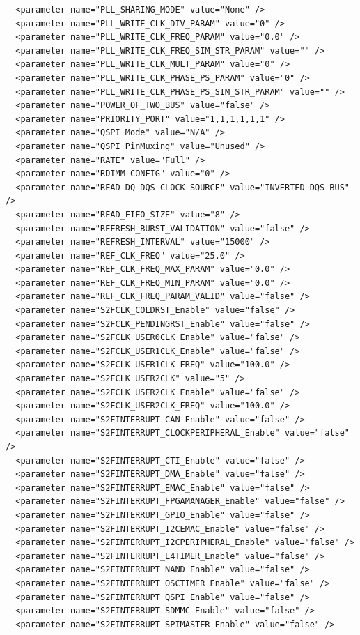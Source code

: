 \documentclass[conference]{IEEEtran}
\begin{document}
\begin{lstlisting}
  <parameter name="PLL_SHARING_MODE" value="None" />
  <parameter name="PLL_WRITE_CLK_DIV_PARAM" value="0" />
  <parameter name="PLL_WRITE_CLK_FREQ_PARAM" value="0.0" />
  <parameter name="PLL_WRITE_CLK_FREQ_SIM_STR_PARAM" value="" />
  <parameter name="PLL_WRITE_CLK_MULT_PARAM" value="0" />
  <parameter name="PLL_WRITE_CLK_PHASE_PS_PARAM" value="0" />
  <parameter name="PLL_WRITE_CLK_PHASE_PS_SIM_STR_PARAM" value="" />
  <parameter name="POWER_OF_TWO_BUS" value="false" />
  <parameter name="PRIORITY_PORT" value="1,1,1,1,1,1" />
  <parameter name="QSPI_Mode" value="N/A" />
  <parameter name="QSPI_PinMuxing" value="Unused" />
  <parameter name="RATE" value="Full" />
  <parameter name="RDIMM_CONFIG" value="0" />
  <parameter name="READ_DQ_DQS_CLOCK_SOURCE" value="INVERTED_DQS_BUS" />
  <parameter name="READ_FIFO_SIZE" value="8" />
  <parameter name="REFRESH_BURST_VALIDATION" value="false" />
  <parameter name="REFRESH_INTERVAL" value="15000" />
  <parameter name="REF_CLK_FREQ" value="25.0" />
  <parameter name="REF_CLK_FREQ_MAX_PARAM" value="0.0" />
  <parameter name="REF_CLK_FREQ_MIN_PARAM" value="0.0" />
  <parameter name="REF_CLK_FREQ_PARAM_VALID" value="false" />
  <parameter name="S2FCLK_COLDRST_Enable" value="false" />
  <parameter name="S2FCLK_PENDINGRST_Enable" value="false" />
  <parameter name="S2FCLK_USER0CLK_Enable" value="false" />
  <parameter name="S2FCLK_USER1CLK_Enable" value="false" />
  <parameter name="S2FCLK_USER1CLK_FREQ" value="100.0" />
  <parameter name="S2FCLK_USER2CLK" value="5" />
  <parameter name="S2FCLK_USER2CLK_Enable" value="false" />
  <parameter name="S2FCLK_USER2CLK_FREQ" value="100.0" />
  <parameter name="S2FINTERRUPT_CAN_Enable" value="false" />
  <parameter name="S2FINTERRUPT_CLOCKPERIPHERAL_Enable" value="false" />
  <parameter name="S2FINTERRUPT_CTI_Enable" value="false" />
  <parameter name="S2FINTERRUPT_DMA_Enable" value="false" />
  <parameter name="S2FINTERRUPT_EMAC_Enable" value="false" />
  <parameter name="S2FINTERRUPT_FPGAMANAGER_Enable" value="false" />
  <parameter name="S2FINTERRUPT_GPIO_Enable" value="false" />
  <parameter name="S2FINTERRUPT_I2CEMAC_Enable" value="false" />
  <parameter name="S2FINTERRUPT_I2CPERIPHERAL_Enable" value="false" />
  <parameter name="S2FINTERRUPT_L4TIMER_Enable" value="false" />
  <parameter name="S2FINTERRUPT_NAND_Enable" value="false" />
  <parameter name="S2FINTERRUPT_OSCTIMER_Enable" value="false" />
  <parameter name="S2FINTERRUPT_QSPI_Enable" value="false" />
  <parameter name="S2FINTERRUPT_SDMMC_Enable" value="false" />
  <parameter name="S2FINTERRUPT_SPIMASTER_Enable" value="false" />

\end{lstlisting}
\end{document}
